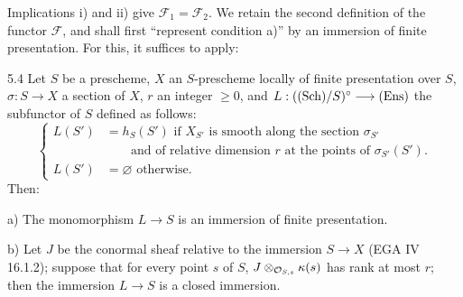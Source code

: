 Implications i) and ii) give $\mathscr F_1=\mathscr F_2$. We retain the second definition of the functor $\mathscr F$, and shall first ``represent condition a)'' by an immersion of finite presentation. For this, it suffices to apply:
\begin{lemma}{5.4}\label{XV.5.4}
Let $S$ be a prescheme, $X$ an $S$-prescheme locally of finite presentation over $S$, $\sigma:S\to X$ a section of $X$, $r$ an integer $\geq0$, and $L:(\textup{(Sch)}/S)^\circ\longrightarrow\textup{(Ens)}$ the subfunctor of $S$ defined as follows:
\[
\left\{\begin{aligned}
L(S')&=h_S(S')\text{ if }X_{S'}\text{ is smooth along the section }\sigma_{S'}\\
&\qquad\text{and of relative dimension }r\text{ at the points of }\sigma_{S'}(S').\\
L(S')&=\varnothing\text{ otherwise.}
\end{aligned}\right.
\]
Then:

\noindent a) The monomorphism $L\to S$ is an immersion of finite presentation.

\noindent b) Let $J$ be the conormal sheaf relative to the immersion $S\to X$ (EGA IV 16.1.2); suppose that for every point $s$ of $S$, $J\otimes_{\mathcal{O}_{S,s}}\kappa(s)$ has rank at most $r$; then the immersion $L\to S$ is a closed immersion.
\end{lemma}
